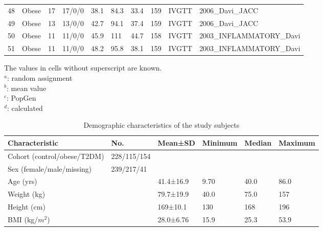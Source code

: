 \documentclass[utf8]{frontiersSCNS} %
\begin{document}
\begin{table}[h]
{\begin{tabular}{llllllllll}
48 & Obese   & 17 & 17/0/0  & 38.1   & 84.3    & 33.4   & 159   & IVGTT    & 2006_Davi_JACC           \\
49 & Obese   & 13 & 13/0/0  & 42.7   & 94.1    & 37.4   & 159   & IVGTT    & 2006_Davi_JACC           \\
50 & Obese   & 11 & 11/0/0  & 45.9   & 111     & 44.7   & 158   & IVGTT    & 2003_INFLAMMATORY_Davi   \\
51 & Obese   & 11 & 11/0/0  & 48.2   & 95.8    & 38.1   & 159   & IVGTT    & 2003_INFLAMMATORY_Davi  \\ \hline
\end{tabular}}
The values in cells without superscript are known. \\ 
$^a$: random assignment \\
$^b$: mean value \\
$^c$: PopGen \\
$^d$: calculated \\
\end{table}


\begin{table}[h]
\caption{Demographic characteristics of the study subjects}
\label{tab:demo}
\begin{tabular}{llllll}
\hline
Characteristic                & No.         & Mean±SD     & Minimum & Median & Maximum \\ \hline
Cohort (control/obese/T2DM)   & 228/115/154 &             &         &        &         \\
Sex (female/male/missing)     & 239/217/41  &             &         &        &         \\
Age (yrs)                     &             & 41.4±16.9 & 9.70    & 40.0  & 86.0  \\
Weight (kg)                   &             & 79.7±19.9 & 40.0   & 75.0  & 157 \\
Height (cm)                   &             & 169±10.1 & 130  & 168 & 196 \\
BMI (kg/$m^2$) &             & 28.0±6.76  & 15.9  & 25.3  & 53.9  \\ \hline
\end{tabular}
\end{table}
\end{document}
